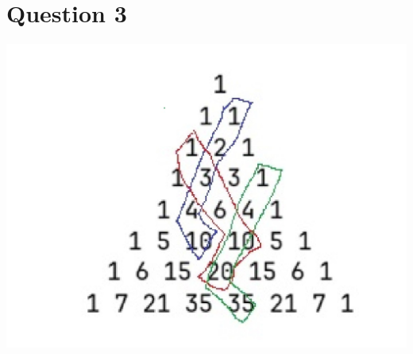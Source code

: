 \documentclass[hidelinks]{article}
\begin{document}
\section*{Question 3}

\includegraphics[scale=0.75]{pascal}
\end{document}
